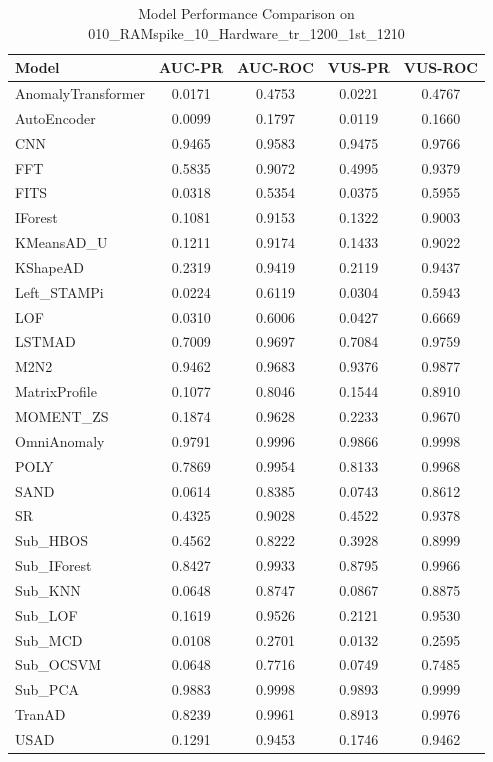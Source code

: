 \documentclass[12pt,oneside]{article}
\begin{document}
\begin{table}[H]
    \centering
    \caption{Model Performance Comparison on 010\_RAMspike\_10\_Hardware\_tr\_1200\_1st\_1210}
    \begin{tabular}{|l|c|c|c|c|}
        \toprule
        \textbf{Model} & \textbf{AUC-PR} & \textbf{AUC-ROC} & \textbf{VUS-PR} & \textbf{VUS-ROC} \\
        \midrule
        AnomalyTransformer & 0.0171 & 0.4753 & 0.0221 & 0.4767 \\
        AutoEncoder & 0.0099 & 0.1797 & 0.0119 & 0.1660 \\
        CNN & 0.9465 & 0.9583 & 0.9475 & 0.9766 \\
        FFT & 0.5835 & 0.9072 & 0.4995 & 0.9379 \\
        FITS & 0.0318 & 0.5354 & 0.0375 & 0.5955 \\
        IForest & 0.1081 & 0.9153 & 0.1322 & 0.9003 \\
        KMeansAD\_U & 0.1211 & 0.9174 & 0.1433 & 0.9022 \\
        KShapeAD & 0.2319 & 0.9419 & 0.2119 & 0.9437 \\
        Left\_STAMPi & 0.0224 & 0.6119 & 0.0304 & 0.5943 \\
        LOF & 0.0310 & 0.6006 & 0.0427 & 0.6669 \\
        LSTMAD & 0.7009 & 0.9697 & 0.7084 & 0.9759 \\
        M2N2 & 0.9462 & 0.9683 & 0.9376 & 0.9877 \\
        MatrixProfile & 0.1077 & 0.8046 & 0.1544 & 0.8910 \\
        MOMENT\_ZS & 0.1874 & 0.9628 & 0.2233 & 0.9670 \\
        OmniAnomaly & 0.9791 & 0.9996 & 0.9866 & 0.9998 \\
        POLY & 0.7869 & 0.9954 & 0.8133 & 0.9968 \\
        SAND & 0.0614 & 0.8385 & 0.0743 & 0.8612 \\
        SR & 0.4325 & 0.9028 & 0.4522 & 0.9378 \\
        Sub\_HBOS & 0.4562 & 0.8222 & 0.3928 & 0.8999 \\
        Sub\_IForest & 0.8427 & 0.9933 & 0.8795 & 0.9966 \\
        Sub\_KNN & 0.0648 & 0.8747 & 0.0867 & 0.8875 \\
        Sub\_LOF & 0.1619 & 0.9526 & 0.2121 & 0.9530 \\
        Sub\_MCD & 0.0108 & 0.2701 & 0.0132 & 0.2595 \\
        Sub\_OCSVM & 0.0648 & 0.7716 & 0.0749 & 0.7485 \\
        Sub\_PCA & 0.9883 & 0.9998 & 0.9893 & 0.9999 \\
        TranAD & 0.8239 & 0.9961 & 0.8913 & 0.9976 \\
        USAD & 0.1291 & 0.9453 & 0.1746 & 0.9462 \\
        \bottomrule
    \end{tabular}

    \label{tab:model_performance_RAMspike}
\end{table}
\end{document}
